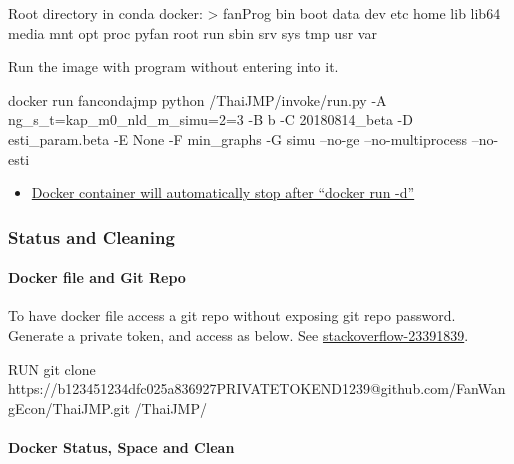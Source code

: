 \documentclass[
]{book}
\newenvironment{Shaded}{\begin{snugshade}}{\end{snugshade}}
\newcommand{\ExtensionTok}[1]{#1}
\newcommand{\NormalTok}[1]{#1}
\providecommand{\tightlist}{%
  \setlength{\itemsep}{0pt}\setlength{\parskip}{0pt}}
\begin{document}
Root directory in conda docker:
\textgreater{} fanProg bin boot data dev etc home lib lib64 media mnt opt proc pyfan root run sbin srv sys tmp usr var

Run the image with program without entering into it.

\begin{Shaded}
\begin{Highlighting}[]
\ExtensionTok{docker}\NormalTok{ run fancondajmp python /ThaiJMP/invoke/run.py -A ng_s_t=kap_m0_nld_m_simu=2=3 -B b -C 20180814_beta -D esti_param.beta -E None -F min_graphs -G simu --no-ge --no-multiprocess --no-esti}
\end{Highlighting}
\end{Shaded}

\begin{itemize}
\tightlist
\item
  \href{https://stackoverflow.com/questions/30209776/docker-container-will-automatically-stop-after-docker-run-d}{Docker container will automatically stop after ``docker run -d''}
\end{itemize}

\hypertarget{status-and-cleaning}{%
\subsubsection{Status and Cleaning}\label{status-and-cleaning}}

\hypertarget{docker-file-and-git-repo}{%
\paragraph{Docker file and Git Repo}\label{docker-file-and-git-repo}}

To have docker file access a git repo without exposing git repo password. Generate a private token, and access as below. See \href{https://stackoverflow.com/a/29464430/8280804}{stackoverflow-23391839}.

\begin{Shaded}
\begin{Highlighting}[]
\ExtensionTok{RUN}\NormalTok{ git clone https://b123451234dfc025a836927PRIVATETOKEND1239@github.com/FanWangEcon/ThaiJMP.git /ThaiJMP/}
\end{Highlighting}
\end{Shaded}

\hypertarget{docker-status-space-and-clean}{%
\paragraph{Docker Status, Space and Clean}\label{docker-status-space-and-clean}}
\end{document}
